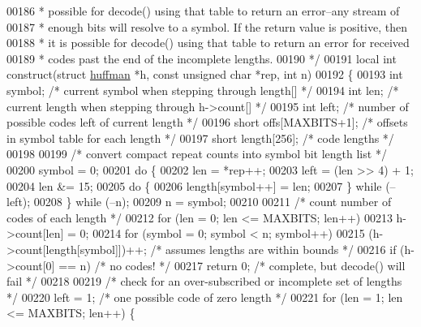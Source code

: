 \begin{DoxyCode}
00186 \textcolor{comment}{ * possible for decode() using that table to return an error--any stream of}
00187 \textcolor{comment}{ * enough bits will resolve to a symbol.  If the return value is positive, then}
00188 \textcolor{comment}{ * it is possible for decode() using that table to return an error for received}
00189 \textcolor{comment}{ * codes past the end of the incomplete lengths.}
00190 \textcolor{comment}{ */}
00191 local \textcolor{keywordtype}{int} construct(\textcolor{keyword}{struct} \hyperlink{structhuffman}{huffman} *h, \textcolor{keyword}{const} \textcolor{keywordtype}{unsigned} \textcolor{keywordtype}{char} *rep, \textcolor{keywordtype}{int} n)
00192 \{
00193     \textcolor{keywordtype}{int} symbol;         \textcolor{comment}{/* current symbol when stepping through length[] */}
00194     \textcolor{keywordtype}{int} len;            \textcolor{comment}{/* current length when stepping through h->count[] */}
00195     \textcolor{keywordtype}{int} left;           \textcolor{comment}{/* number of possible codes left of current length */}
00196     \textcolor{keywordtype}{short} offs[MAXBITS+1];      \textcolor{comment}{/* offsets in symbol table for each length */}
00197     \textcolor{keywordtype}{short} length[256];  \textcolor{comment}{/* code lengths */}
00198 
00199     \textcolor{comment}{/* convert compact repeat counts into symbol bit length list */}
00200     symbol = 0;
00201     \textcolor{keywordflow}{do} \{
00202         len = *rep++;
00203         left = (len >> 4) + 1;
00204         len &= 15;
00205         \textcolor{keywordflow}{do} \{
00206             length[symbol++] = len;
00207         \} \textcolor{keywordflow}{while} (--left);
00208     \} \textcolor{keywordflow}{while} (--n);
00209     n = symbol;
00210 
00211     \textcolor{comment}{/* count number of codes of each length */}
00212     \textcolor{keywordflow}{for} (len = 0; len <= MAXBITS; len++)
00213         h->count[len] = 0;
00214     for (symbol = 0; symbol < n; symbol++)
00215         (h->count[length[symbol]])++;   \textcolor{comment}{/* assumes lengths are within bounds */}
00216     \textcolor{keywordflow}{if} (h->count[0] == n)               \textcolor{comment}{/* no codes! */}
00217         \textcolor{keywordflow}{return} 0;                       \textcolor{comment}{/* complete, but decode() will fail */}
00218 
00219     \textcolor{comment}{/* check for an over-subscribed or incomplete set of lengths */}
00220     left = 1;                           \textcolor{comment}{/* one possible code of zero length */}
00221     \textcolor{keywordflow}{for} (len = 1; len <= MAXBITS; len++) \{

\end{DoxyCode}
